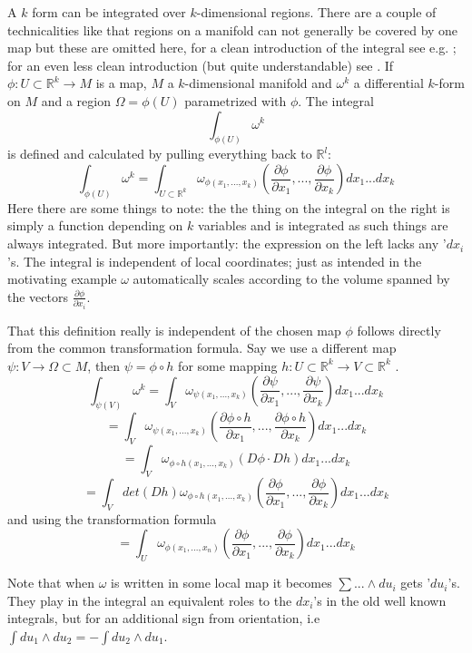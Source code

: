 A $k$ form can be integrated over $k$-dimensional regions. There are a couple of technicalities like that regions on a manifold can not generally be covered by one map but these are omitted here, for a clean introduction of the integral see e.g. ; for an even less clean introduction (but quite understandable) see . If $\phi : U \subset \mathbb R^k \to M$ is a map, $M$ a $k$-dimensional manifold and $\omega^k$ a differential $k$-form on $M$ and a region $\Omega = \phi(U)$ parametrized with $\phi$. The integral 
\[\int_{\phi(U)} \omega^k \]
is defined and calculated by pulling everything back to $\mathbb R^l$:
\[\int_{\phi(U)} \omega^k = \int_{U\subset\mathbb R^k} \omega_{\phi(x_1,...,x_k)}(\frac{\partial \phi}{\partial x_1},...,\frac{\partial \phi}{\partial x_k}) d x_1...d x_k\]
Here there are some things to note: the the thing on the integral on the right is simply a function depending on $k$ variables and is integrated as such things are always integrated. But more importantly: the expression on the left  lacks any '$d x_i$'s. The integral is independent of local coordinates; just as intended in the motivating example $\omega$ automatically scales according to the volume spanned by the vectors $\frac{\partial \phi}{\partial x_i}$. 

That this definition really is independent of the chosen map $\phi$ follows directly from the common transformation formula. Say we use a different map $\psi: V \rightarrow \Omega \subset M$, then $\psi = \phi \circ h$ for some mapping $h:U \subset \mathbb R^k \rightarrow V \subset \mathbb R^k$ . 
\[\int_{\psi(V)} \omega^k = \int_V \omega_{\psi(x_1,...,x_k)}(\frac{\partial \psi}{\partial x_1},...,\frac{\partial \psi}{\partial x_k}) d x_1...d x_k\]
\[= \int_V \omega_{\psi(x_1,...,x_k)}(\frac{\partial \phi \circ h}{\partial x_1},...,\frac{\partial \phi \circ h}{\partial x_k}) d x_1...d x_k\]
\[= \int_V \omega_{\phi\circ h(x_1,...,x_k)}(D\phi \cdot Dh) d x_1...d x_k\]
\[= \int_{V} det(Dh) \omega_{\phi\circ h(x_1,...,x_k)}(\frac{\partial \phi}{\partial x_1},...,\frac{\partial \phi}{\partial x_k}) d x_1...d x_k\]
and using the transformation formula
\[= \int_U \omega_{\phi(x_1,...,x_n)} (\frac{\partial \phi}{\partial x_1},...,\frac{\partial \phi}{\partial x_k}) d x_1...d x_k \]

Note that when $\omega$ is written in some local map it becomes $\sum ... \wedge d u_i$ gets '$du_i$'s. They play in the integral an equivalent roles to the $d x_i$'s in the old well known integrals, but for an additional sign from orientation, i.e $\int du_1\wedge du_2 = - \int du_2 \wedge du_1$.

